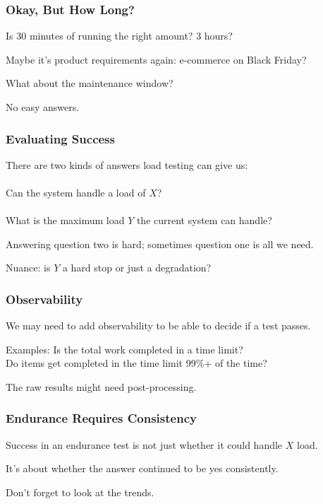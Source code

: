 \begin{frame}
\frametitle{Okay, But How Long?}
Is 30 minutes of running the right amount? 3 hours?

Maybe it's product requirements again: e-commerce on Black Friday?

What about the maintenance window?

No easy answers.

\end{frame}


\begin{frame}
\frametitle{Evaluating Success}

There are two kinds of answers load testing can give us:\\~\\
\quad Can the system handle a load of $X$?\\~\\
\quad What is the maximum load $Y$ the current system can handle?

Answering question two is hard; sometimes question one is all we need.

Nuance: is $Y$ a hard stop or just a degradation?

\end{frame}

\begin{frame}
\frametitle{Observability}

We may need to add observability to be able to decide if a test passes.

Examples: Is the total work completed in a time limit?\\
\quad Do items get completed in the time limit 99\%+ of the time?

The raw results might need post-processing.

\end{frame}

\begin{frame}
\frametitle{Endurance Requires Consistency}

Success in an endurance test is not just whether it could handle $X$ load.

It's about whether the answer continued to be yes consistently.

Don't forget to look at the trends. 

\end{frame}

